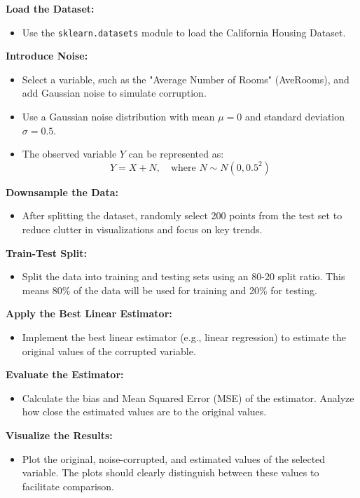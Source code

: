 \documentclass{article}
\begin{document}
\textbf{Load the Dataset:}
\begin{itemize}
    \item Use the \texttt{sklearn.datasets} module to load the California Housing Dataset.
\end{itemize}

\textbf{Introduce Noise:}
\begin{itemize}
    \item Select a variable, such as the "Average Number of Rooms" (AveRooms), and add Gaussian noise to simulate corruption. 
    \item Use a Gaussian noise distribution with mean $\mu = 0$ and standard deviation $\sigma = 0.5$.
    \item The observed variable $Y$ can be represented as:
    \[
    Y = X + N, \quad \text{where } N \sim N(0, 0.5^2)
    \]
\end{itemize}

\textbf{Downsample the Data:}
\begin{itemize}
    \item After splitting the dataset, randomly select 200 points from the test set to reduce clutter in visualizations and focus on key trends. 
\end{itemize}

\textbf{Train-Test Split:}
\begin{itemize}
    \item Split the data into training and testing sets using an 80-20 split ratio. This means 80\% of the data will be used for training and 20\% for testing.
\end{itemize}

\textbf{Apply the Best Linear Estimator:}
\begin{itemize}
    \item Implement the best linear estimator (e.g., linear regression) to estimate the original values of the corrupted variable.
\end{itemize}

\textbf{Evaluate the Estimator:}
\begin{itemize}
    \item Calculate the bias and Mean Squared Error (MSE) of the estimator. Analyze how close the estimated values are to the original values.
\end{itemize}

\textbf{Visualize the Results:}
\begin{itemize}
    \item Plot the original, noise-corrupted, and estimated values of the selected variable. The plots should clearly distinguish between these values to facilitate comparison.
\end{itemize}
\end{document}
